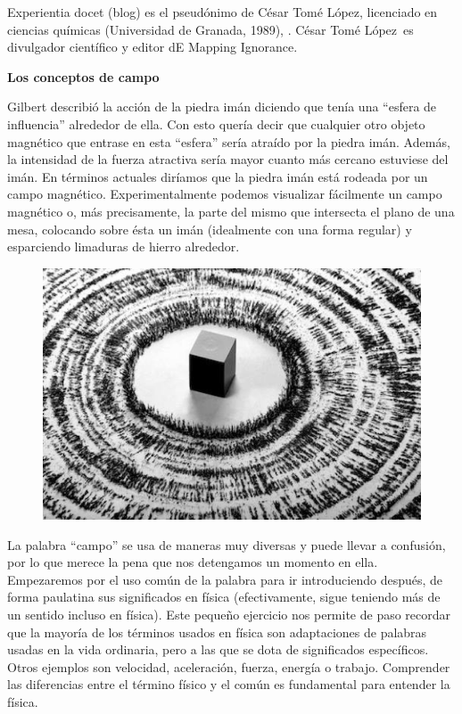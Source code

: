 \textcolor{gris}{ Experientia docet (blog) es el pseudónimo de César Tomé López,  licenciado en ciencias químicas (Universidad de Granada, 1989), . César Tomé López es divulgador científico y editor dE Mapping Ignorance.}

\vspace{4mm}

\textbf{Los conceptos de campo}

Gilbert describió la acción de la piedra imán diciendo que tenía una “esfera de influencia” alrededor de ella. Con esto quería decir que cualquier otro objeto magnético que entrase en esta “esfera” sería atraído por la piedra imán. Además, la intensidad de la fuerza atractiva sería mayor cuanto más cercano estuviese del imán. En términos actuales diríamos que la piedra imán está rodeada por un campo magnético. Experimentalmente podemos visualizar fácilmente un campo magnético o, más precisamente, la parte del mismo que intersecta el plano de una mesa, colocando sobre ésta un imán (idealmente con una forma regular) y esparciendo limaduras de hierro alrededor.

	\begin{figure}[H]
	\centering
	\includegraphics[width=1\textwidth]{imagenes/imagenes10/ExperientiaDocet01.png}
	\end{figure}

La palabra “campo” se usa de maneras muy diversas y puede llevar a confusión, por lo que merece la pena que nos detengamos un momento en ella. Empezaremos por el uso común de la palabra para ir introduciendo después, de forma paulatina sus significados en física (efectivamente, sigue teniendo más de un sentido incluso en física). Este pequeño ejercicio nos permite de paso recordar que la mayoría de los términos usados en física son adaptaciones de palabras usadas en la vida ordinaria, pero a las que se dota de significados específicos. Otros ejemplos son velocidad, aceleración, fuerza, energía o trabajo. Comprender las diferencias entre el término físico y el común es fundamental para entender la física.

